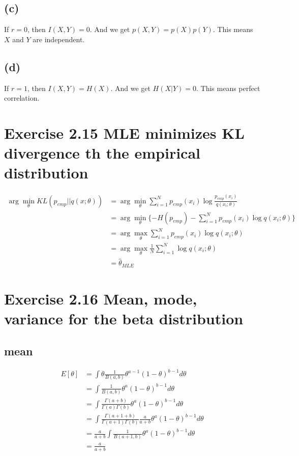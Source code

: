 \documentclass{jsarticle}
\begin{document}
\subsection*{(c)}
If $r=0$, then $I(X,Y)=0$.
And we get $p(X,Y)=p(X)p(Y)$.
This means $X$ and $Y$ are independent.
\subsection*{(d)}
If $r=1$, then $I(X,Y)=H(X)$.
And we get $H(X|Y)=0$.
This means perfect correlation.

\section*{Exercise 2.15 MLE minimizes KL divergence th the empirical distribution}
\begin{align}
\arg \min_\theta KL(p_{emp}||q(x;\theta)) & = \arg \min_\theta \sum_{i=1}^{N}p_{emp}(x_i)\log \frac{p_{emp}(x_i)}{q(x_i;\theta)}\\
& =  \arg \min_\theta \{-H(p_{emp})-\sum_{i=1}^{N}p_{emp}(x_i)\log q(x_i;\theta) \}\\
& = \arg \max_\theta \sum_{i=1}^{N}p_{emp}(x_i)\log q(x_i;\theta)\\
& = \arg \max_\theta \frac{1}{N}\sum_{i=1}^{N}\log q(x_i;\theta)\\
& = \hat{\theta}_{MLE}
\end{align}

\section*{Exercise 2.16 Mean, mode, variance for the beta distribution}
\subsection*{mean}
\begin{align}
E[\theta] & = \int \theta \frac{1}{B(a,b)}\theta^{a-1}(1-\theta)^{b-1}d\theta\\
& = \int \frac{1}{B(a,b)}\theta^{a}(1-\theta)^{b-1}d\theta\\
& = \int \frac{\Gamma(a+b)}{\Gamma(a)\Gamma(b)}\theta^{a}(1-\theta)^{b-1}d\theta\\
& = \int \frac{\Gamma(a+1+b)}{\Gamma(a+1)\Gamma(b)}\frac{a}{a+b}\theta^{a}(1-\theta)^{b-1}d\theta\\
& = \frac{a}{a+b}\int \frac{1}{B(a+1,b)}\theta^{a}(1-\theta)^{b-1}d\theta\\
& = \frac{a}{a+b}
\end{align}
\end{document}
